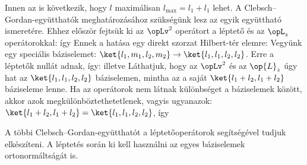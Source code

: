    Innen az is következik, hogy $l$ maximálisan $l_\text{max}=l_1+l_1$ lehet.
   A Clebsch--Gor\-dan-egy\-ütt\-ha\-tók meghatározásához szükségünk lesz az egyik együttható ismeretére.
   Ehhez először fejtsük ki az $\opLv^2$ operátort a léptető és az $\opL_z$ operátorokkal:
   így
   Ennek a hatása egy direkt szorzat Hilbert-tér elemre:
   Vegyünk egy speciális báziselemet: $\ket{l_1,m_1,l_2,m_2}\to\ket{l_1,l_1,l_2,l_2}$.
   Erre a léptetők nullát adnak, így:
   illetve
   Láthatjuk, hogy az $\opLv^2$ és az $\op{L}_z$ úgy hat az $\ket{l_1,l_1,l_2,l_2}$ báziselemen, mintha az a saját $\ket{l_1+l_2,l_1+l_2}$ báziseleme lenne.
   Ha az operátorok nem látnak különbséget a báziselemek között, akkor azok megkülönböztethetetlenek, vagyis ugyanazok: $\ket{l_1+l_2,l_1+l_2}=\ket{l_1,l_1,l_2,l_2}$, így
   
   A többi Clebsch--Gordan-együtthatót a léptetőoperátorok segítségével tudjuk elkészíteni.
   A léptetés során ki kell használni az egyes báziselemek ortonormáltságát is. 
   
